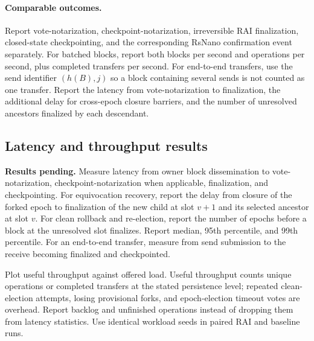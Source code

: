 \documentclass[10pt,twocolumn]{article}
\begin{document}
\paragraph{Comparable outcomes.} Report vote-notarization, checkpoint-notarization, irreversible RAI finalization, closed-state checkpointing, and the corresponding RsNano confirmation event separately. For batched blocks, report both blocks per second and operations per second, plus completed transfers per second. For end-to-end transfers, use the send identifier $(h(B),j)$ so a block containing several sends is not counted as one transfer. Report the latency from vote-notarization to finalization, the additional delay for cross-epoch closure barriers, and the number of unresolved ancestors finalized by each descendant.

\subsection{Latency and throughput results}
\noindent\textbf{Results pending.} Measure latency from owner block dissemination to vote-notarization, checkpoint-notarization when applicable, finalization, and checkpointing. For equivocation recovery, report the delay from closure of the forked epoch to finalization of the new child at slot $v+1$ and its selected ancestor at slot $v$. For clean rollback and re-election, report the number of epochs before a block at the unresolved slot finalizes. Report median, 95th percentile, and 99th percentile. For an end-to-end transfer, measure from send submission to the receive becoming finalized and checkpointed.

Plot useful throughput against offered load. Useful throughput counts unique operations or completed transfers at the stated persistence level; repeated clean-election attempts, losing provisional forks, and epoch-election timeout votes are overhead. Report backlog and unfinished operations instead of dropping them from latency statistics. Use identical workload seeds in paired RAI and baseline runs.

\begin{center}
\end{center}
\end{document}
